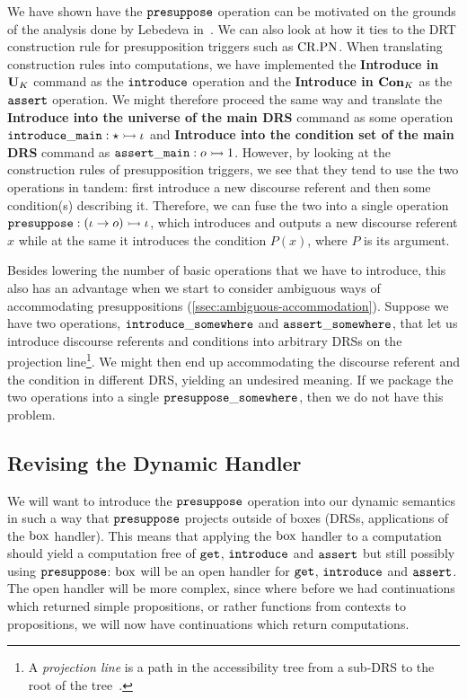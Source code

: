 We have shown have the $\mathtt{presuppose}$ operation can be motivated on the
grounds of the analysis done by Lebedeva
in~\cite{lebedeva2012expression}. We can also look at how it ties to the
DRT construction rule for presupposition triggers such as $\mathrm{CR.PN}$. When
translating construction rules into computations, we have implemented the
\textbf{Introduce in $\mathbf{U}_K$} command as the $\mathtt{introduce}$
operation and the \textbf{Introduce in $\mathbf{Con}_K$} as the
$\mathtt{assert}$ operation. We might therefore proceed the same way and
translate the \textbf{Introduce into the universe of the main DRS} command
as some operation $\mathtt{introduce\_main} : \star \rightarrowtail \iota$ and
\textbf{Introduce into the condition set of the main DRS} command as
$\mathtt{assert\_main} : o \rightarrowtail 1$. However, by looking at the construction
rules of presupposition triggers, we see that they tend to use the two
operations in tandem: first introduce a new discourse referent and then
some condition(s) describing it. Therefore, we can fuse the two into a
single operation $\mathtt{presuppose} : (\iota \to o) \rightarrowtail \iota$, which
introduces and outputs a new discourse referent $x$ while at the same it
introduces the condition $P(x)$, where $P$ is its argument.

Besides lowering the number of basic operations that we have to introduce,
this also has an advantage when we start to consider ambiguous ways of
accommodating presuppositions
(\ref{ssec:ambiguous-accommodation}). Suppose we have two operations,
$\mathtt{introduce\_somewhere}$ and $\mathtt{assert\_somewhere}$, that let us
introduce discourse referents and conditions into arbitrary DRSs on the
projection line\footnote{A \emph{projection line} is a path in the
  accessibility tree from a sub-DRS to the root of the
  tree~\cite{van1992presupposition}.}. We might then end up accommodating
the discourse referent and the condition in different DRS, yielding an
undesired meaning. If we package the two operations into a single
$\mathtt{presuppose\_somewhere}$, then we do not have this problem.


\subsection{Revising the Dynamic Handler}
\label{ssec:revising-dynamic-handler}

We will want to introduce the $\mathtt{presuppose}$ operation into our dynamic
semantics in such a way that $\mathtt{presuppose}$ projects outside of boxes
(DRSs, applications of the $\mathrm{box}$ handler). This means that applying the
$\mathrm{box}$ handler to a computation should yield a computation free of
$\mathtt{get}$, $\mathtt{introduce}$ and $\mathtt{assert}$ but still possibly using
$\mathtt{presuppose}$: $\mathrm{box}$ will be an open handler for $\mathtt{get}$,
$\mathtt{introduce}$ and $\mathtt{assert}$. The open handler will be more complex,
since where before we had continuations which returned simple propositions,
or rather functions from contexts to propositions, we will now have
continuations which return computations.

